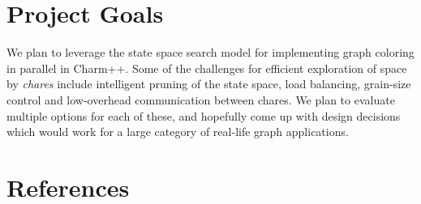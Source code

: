 \documentclass[10pt,twoside]{article}
\begin{document}
\section{Project Goals}
   We plan to leverage the state space search model for implementing graph coloring in parallel in Charm++. Some of the challenges for efficient exploration of space by \textit{chares} include intelligent pruning of the state space, load balancing, grain-size control and low-overhead communication between chares. We plan to evaluate multiple options for each of these, and hopefully come up with design decisions which would work for a large category of real-life graph applications.
	
\section{References}

%
\end{document}
